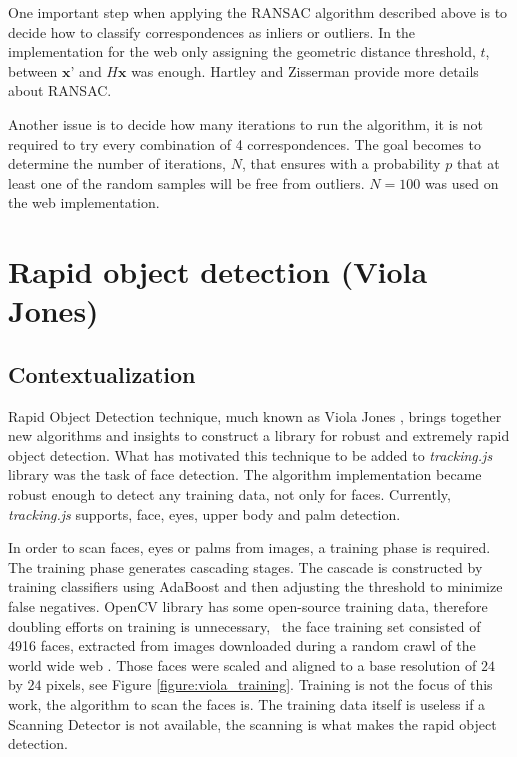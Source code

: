 One important step when applying the RANSAC algorithm described above is to decide how to classify correspondences as inliers or outliers. In the implementation for the web only assigning the geometric distance threshold, $t$, between $\textbf{x'}$ and $H\textbf{x}$ was enough. Hartley and Zisserman \cite{Hartley2004} provide more details about RANSAC.

Another issue is to decide how many iterations to run the algorithm, it is not required to try every combination of 4 correspondences. The goal becomes to determine the number of iterations, $N$, that ensures with a probability $p$ that at least one of the random samples will be free from outliers. $N=100$ was used on the web implementation.



\section{Rapid object detection (Viola Jones)} %
\label{sec:tracking_library_for_the_web:rapid_object_detection}

\subsection{Contextualization} %
\label{sub:tracking_library_for_the_web:rapid_object_detection:contextualization}

Rapid Object Detection technique, much known as Viola Jones \cite{Viola2001}, brings together new algorithms and insights to construct a library for robust and extremely rapid object detection. What has motivated this technique to be added to \textit{tracking.js} library was the task of face detection. The algorithm implementation became robust enough to detect any training data, not only for faces. Currently, \textit{tracking.js} supports, face, eyes, upper body and palm detection.

In order to scan faces, eyes or palms from images, a training phase is required. The training phase generates cascading stages. The cascade is constructed by training classifiers using AdaBoost \cite{Viola2001} and then adjusting the threshold to minimize false negatives. OpenCV library \cite{Bradski2000} has some open-source training data, therefore doubling efforts on training is unnecessary, \ie\ the face training set consisted of 4916 faces, extracted from images downloaded during a random crawl of the world wide web \cite{Viola2001}. Those faces were scaled and aligned to a base resolution of $24$ by $24$ pixels, see Figure \ref{figure:viola_training}. Training is not the focus of this work, the algorithm to scan the faces is. The training data itself is useless if a Scanning Detector is not available, the scanning is what makes the rapid object detection.

